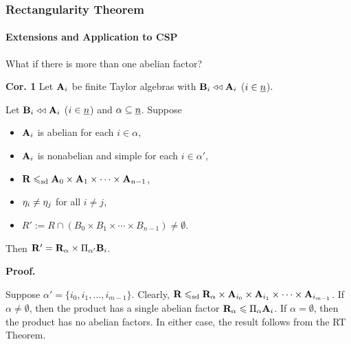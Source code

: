 \documentclass[xcolor=dvipsnames,9pt,hide notes,mathserif]{beamer}
\begin{document}
\begin{frame} \frametitle{Rectangularity Theorem}
  \framesubtitle{Extensions and Application to CSP}
  What if there is more than one abelian factor? 

  \bigskip
  {\bf Cor. 1} Let $\mathbf{A}_i$ be finite Taylor algebras with
  $\mathbf{B}_i \mathrel{\triangleleft\triangleleft} \mathbf{A}_i$ ($i\in \underline{n}$).
  
  Let $\mathbf{B}_i \mathrel{\triangleleft\triangleleft} \mathbf{A}_i$ ($i\in \underline{n}$) and $\alpha \subseteq \underline{n}$.  Suppose
  \begin{itemize}
  \item $\mathbf{A}_i$ is abelian for each $i \in \alpha$,
  \item $\mathbf{A}_i$ is nonabelian and simple for each $i \in \alpha'$,
  \item $\mathbf{R} \leqslant_{\mathrm{sd}} \mathbf{A}_0 \times \mathbf{A}_1 \times \cdots \times \mathbf{A}_{n-1}$,
  \item $\eta_i \neq \eta_j$ for all $i\neq j$, %
  \item $R':= R \cap (B_0 \times B_1 \times \cdots \times B_{n-1}) \neq \emptyset$.
  \end{itemize}
  Then $\mathbf{R}'= \mathbf{R}_\alpha  \times \Pi_{\alpha'}\mathbf{B}_i$.

  \bigskip
  {\bf Proof.}
  
    Suppose $\alpha' = \{i_0, i_1, \dots, i_{m-1}\}$.
    Clearly, 
    $\mathbf{R} \leqslant_{\mathrm{sd}} \mathbf{R}_\alpha \times \mathbf{A}_{i_0} \times \mathbf{A}_{i_1} \times \cdots \times \mathbf{A}_{i_{m-1}}$. 
    If $\alpha\neq \emptyset$, then the product 
    has a single abelian factor
    $\mathbf{R}_\alpha \leqslant \Pi_{\alpha} \mathbf{A}_i$.
    If $\alpha= \emptyset$, then the product has no abelian factors.
    In either case, the result follows from the RT Theorem.

\end{frame}
\end{document}

